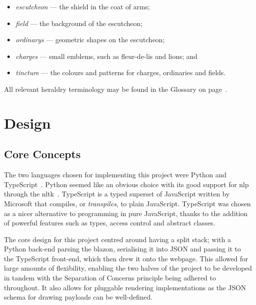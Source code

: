 \documentclass[nobib, a4paper, twoside, justified]{tufte-book}
\makeatletter
\newcommand{\charges}{\glspl{charge}\@\xspace}
\newcommand{\blazon}{\gls{blazon}\@\xspace}
\makeatother
\begin{document}
\begin{itemize}
  \item \textit{\Gls{escutcheon}} --- the shield in the coat of arms;
  \item \textit{\Gls{field}} --- the background of the escutcheon;
  \item \textit{\Glspl{ordinary}} --- geometric shapes on the escutcheon;
  \item \textit{\Glspl{charge}} --- small emblems, such as fleur-de-lis and lions; and
  \item \textit{\Gls{tincture}} --- the colours and patterns for \charges{}, ordinaries and fields.
\end{itemize}

All relevant heraldry terminology may be found in the Glossary on page~\pageref{glossary}.

\chapter{Design}%
\label{cha:design}

\section{Core Concepts}%
\label{sec:core_concepts}

The two languages chosen for implementing this project were Python and
TypeScript~\autocite{typescript}. Python seemed like an obvious choice with its good support for
\gls{nlp} through the \gls{nltk}~\autocite{bird2004nltk}. TypeScript is a typed superset of
JavaScript written by Microsoft that compiles, or \textit{\glspl{transpile}}, to plain JavaScript.
TypeScript was chosen as a nicer alternative to programming in pure JavaScript, thanks to the
addition of powerful features such as types, access control and abstract classes.

The core design for this project centred around having a split stack; with a Python back-end
parsing the \blazon, serialising it into JSON  and passing it to the TypeScript front-end, which then drew it
onto the webpage. This allowed for large amounts of flexibility, enabling the two halves of the
project to be developed in tandem with the Separation of Concerns principle being adhered to
throughout. It also allows for pluggable rendering implementations as the JSON schema for drawing
payloads can be well-defined.
\end{document}
